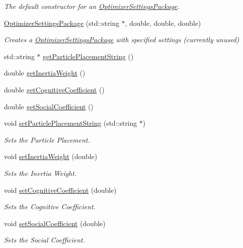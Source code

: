\begin{DoxyCompactItemize}
\begin{DoxyCompactList}\small\item\em The default constructor for an \hyperlink{class_optimizer_settings_package}{Optimizer\+Settings\+Package}. \end{DoxyCompactList}\item 
\hyperlink{class_optimizer_settings_package_a69a8c18448ba70702fc6fa3dd87848b4}{Optimizer\+Settings\+Package} (std\+::string $\ast$, double, double, double)
\begin{DoxyCompactList}\small\item\em Creates a \hyperlink{class_optimizer_settings_package}{Optimizer\+Settings\+Package} with specified settings (currently unused) \end{DoxyCompactList}\item 
std\+::string $\ast$ \hyperlink{class_optimizer_settings_package_abbc65564f1d7fae597e36f64c0ba4846}{get\+Particle\+Placement\+String} ()
\item 
double \hyperlink{class_optimizer_settings_package_af914190cf768d01151748918824caadc}{get\+Inertia\+Weight} ()
\item 
double \hyperlink{class_optimizer_settings_package_af760320d4abd50d7202d174064c0081d}{get\+Cognitive\+Coefficient} ()
\item 
double \hyperlink{class_optimizer_settings_package_a1c9c6216fdc974d98240a0ed5a935ab5}{get\+Social\+Coefficient} ()
\item 
void \hyperlink{class_optimizer_settings_package_ae0b23faba2bbc26bd43b2a39077524cf}{set\+Particle\+Placement\+String} (std\+::string $\ast$)
\begin{DoxyCompactList}\small\item\em Sets the Particle Placement. \end{DoxyCompactList}\item 
void \hyperlink{class_optimizer_settings_package_a00f4ac2ec3d1b11b2c0c056dc20e902b}{set\+Inertia\+Weight} (double)
\begin{DoxyCompactList}\small\item\em Sets the Inertia Weight. \end{DoxyCompactList}\item 
void \hyperlink{class_optimizer_settings_package_a5af2e5d9a2b5f7f344e7f840b609c33f}{set\+Cognitive\+Coefficient} (double)
\begin{DoxyCompactList}\small\item\em Sets the Cognitive Coefficient. \end{DoxyCompactList}\item 
void \hyperlink{class_optimizer_settings_package_aa45136551d680be4eca1f647c327e79f}{set\+Social\+Coefficient} (double)
\begin{DoxyCompactList}\small\item\em Sets the Social Coefficient. \end{DoxyCompactList}\end{DoxyCompactItemize}


